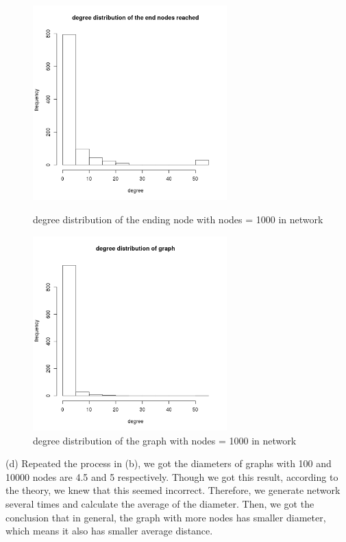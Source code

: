 \documentclass[draftcls,12pt,onecolumn]{IEEEtran}
\begin{document}
\begin{figure}[htbp]
\centering
\begin{minipage}[t]{0.48\textwidth}
\centering
\includegraphics[width=7.5cm]{2_2_c_end_nodes_degree.png}
\caption{degree distribution of the ending node with nodes = 1000 in network}
\end{minipage}
\begin{minipage}[t]{0.48\textwidth}
\centering
\includegraphics[width=7.5cm]{2_2_c_graph_degree.png}
\caption{degree distribution of the graph with nodes = 1000 in network}
\end{minipage}
\end{figure}

(d) Repeated the process in (b), we got the diameters of graphs with 100 and 10000 nodes are 4.5 and 5 respectively. Though we got this result, according to the theory, we knew that this seemed incorrect. Therefore, we generate network several times and calculate the average of the diameter. Then, we got the conclusion that in general, the graph with more nodes has smaller diameter, which means it also has smaller average distance.
\end{document}
